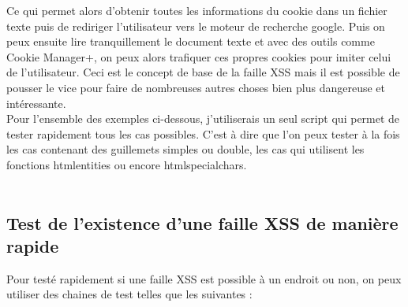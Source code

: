 \documentclass{article}
\begin{document}
Ce qui permet alors d'obtenir toutes les informations du cookie dans un fichier texte puis de rediriger l'utilisateur vers le moteur de recherche google. Puis on peux ensuite lire tranquillement le document texte et avec des outils comme Cookie Manager+, on peux alors trafiquer ces propres cookies pour imiter celui de l'utilisateur. Ceci est le concept de base de la faille XSS mais il est possible de pousser le vice pour faire de nombreuses autres choses bien plus dangereuse et intéressante.\\

Pour l'ensemble des exemples ci-dessous, j'utiliserais un seul script qui permet de tester rapidement tous les cas possibles. C'est à dire que l'on peux tester à la fois les cas contenant des guillemets simples ou double, les cas qui utilisent les fonctions htmlentities ou encore htmlspecialchars.
\vspace{0.2cm}\\
\vspace{0.2cm}\\

\subsection{Test de l'existence d'une faille XSS de manière rapide}
Pour testé rapidement si une faille XSS est possible à un endroit ou non, on peux utiliser des chaines de test telles que les suivantes :
\vspace{0.2cm}\\
\vspace{0.2cm}
\end{document}
